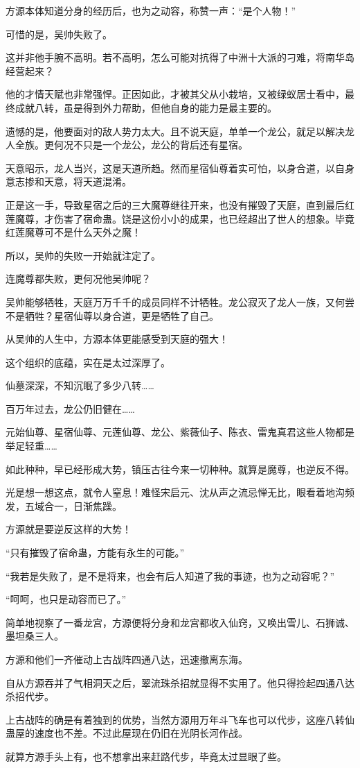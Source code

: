 \begin{this_body}
方源本体知道分身的经历后，也为之动容，称赞一声：“是个人物！”

可惜的是，吴帅失败了。

这并非他手腕不高明。若不高明，怎么可能对抗得了中洲十大派的刁难，将南华岛经营起来？

他的才情天赋也非常强悍。正因如此，才被其父从小栽培，又被绿蚁居士看中，最终成就八转，虽是得到外力帮助，但他自身的能力是最主要的。

遗憾的是，他要面对的敌人势力太大。且不说天庭，单单一个龙公，就足以解决龙人全族。更何况不只是一个龙公，龙公的背后还有星宿。

天意昭示，龙人当兴，这是天道所趋。然而星宿仙尊着实可怕，以身合道，以自身意志掺和天意，将天道混淆。

正是这一手，导致星宿之后的三大魔尊继往开来，也没有摧毁了天庭，直到最后红莲魔尊，才伤害了宿命蛊。饶是这份小小的成果，也已经超出了世人的想象。毕竟红莲魔尊可不是什么天外之魔！

所以，吴帅的失败一开始就注定了。

连魔尊都失败，更何况他吴帅呢？

吴帅能够牺牲，天庭万万千千的成员同样不计牺牲。龙公寂灭了龙人一族，又何尝不是牺牲？星宿仙尊以身合道，更是牺牲了自己。

从吴帅的人生中，方源本体更能感受到天庭的强大！

这个组织的底蕴，实在是太过深厚了。

仙墓深深，不知沉眠了多少八转……

百万年过去，龙公仍旧健在……

元始仙尊、星宿仙尊、元莲仙尊、龙公、紫薇仙子、陈衣、雷鬼真君这些人物都是举足轻重……

如此种种，早已经形成大势，镇压古往今来一切种种。就算是魔尊，也逆反不得。

光是想一想这点，就令人窒息！难怪宋启元、沈从声之流忌惮无比，眼看着地沟频发，五域合一，日渐焦躁。

方源就是要逆反这样的大势！

“只有摧毁了宿命蛊，方能有永生的可能。”

“我若是失败了，是不是将来，也会有后人知道了我的事迹，也为之动容呢？”

“呵呵，也只是动容而已了。”

简单地视察了一番龙宫，方源便将分身和龙宫都收入仙窍，又唤出雪儿、石狮诚、墨坦桑三人。

方源和他们一齐催动上古战阵四通八达，迅速撤离东海。

自从方源吞并了气相洞天之后，翠流珠杀招就显得不实用了。他只得捡起四通八达杀招代步。

上古战阵的确是有着独到的优势，当然方源用万年斗飞车也可以代步，这座八转仙蛊屋的速度也不差。不过此屋现在仍旧在光阴长河作战。

就算方源手头上有，也不想拿出来赶路代步，毕竟太过显眼了些。

\end{this_body}

